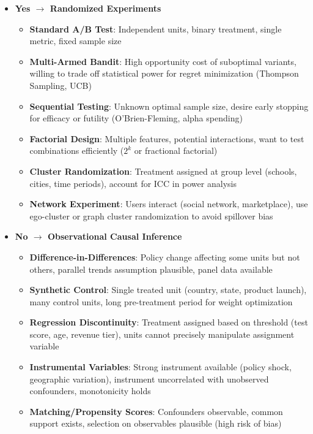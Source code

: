\begin{itemize}
    \item \textbf{Yes $\rightarrow$ Randomized Experiments}
    \begin{itemize}
        \item \textbf{Standard A/B Test}: Independent units, binary treatment, single metric, fixed sample size
        \item \textbf{Multi-Armed Bandit}: High opportunity cost of suboptimal variants, willing to trade off statistical power for regret minimization (Thompson Sampling, UCB)
        \item \textbf{Sequential Testing}: Unknown optimal sample size, desire early stopping for efficacy or futility (O'Brien-Fleming, alpha spending)
        \item \textbf{Factorial Design}: Multiple features, potential interactions, want to test combinations efficiently ($2^k$ or fractional factorial)
        \item \textbf{Cluster Randomization}: Treatment assigned at group level (schools, cities, time periods), account for ICC in power analysis
        \item \textbf{Network Experiment}: Users interact (social network, marketplace), use ego-cluster or graph cluster randomization to avoid spillover bias
    \end{itemize}

    \item \textbf{No $\rightarrow$ Observational Causal Inference}
    \begin{itemize}
        \item \textbf{Difference-in-Differences}: Policy change affecting some units but not others, parallel trends assumption plausible, panel data available
        \item \textbf{Synthetic Control}: Single treated unit (country, state, product launch), many control units, long pre-treatment period for weight optimization
        \item \textbf{Regression Discontinuity}: Treatment assigned based on threshold (test score, age, revenue tier), units cannot precisely manipulate assignment variable
        \item \textbf{Instrumental Variables}: Strong instrument available (policy shock, geographic variation), instrument uncorrelated with unobserved confounders, monotonicity holds
        \item \textbf{Matching/Propensity Scores}: Confounders observable, common support exists, selection on observables plausible (high risk of bias)
    \end{itemize}
\end{itemize}

